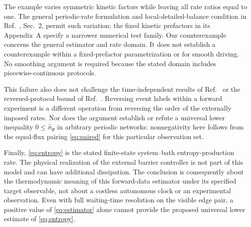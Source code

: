 \documentclass[11pt,a4paper]{article}
\newcommand{\sigw}{\widehat{\sigma}_{\Psi}}
\begin{document}
The example varies symmetric kinetic factors while leaving all rate ratios equal to one. The general periodic-rate formulation and local-detailed-balance condition in Ref.~\cite{Maier2024}, Sec.~2, permit such variation; the fixed kinetic prefactors in its Appendix~A specify a narrower numerical test family. Our counterexample concerns the general estimator and rate domain. It does not establish a counterexample within a fixed-prefactor parametrization or for smooth driving. No smoothing argument is required because the stated domain includes piecewise-continuous protocols.

This failure also does not challenge the time-independent results of Ref.~\cite{vanderMeer2022} or the reversed-protocol bound of Ref.~\cite{Maier2024}. Reversing event labels within a forward experiment is a different operation from reversing the order of the externally imposed rates. Nor does the argument establish or refute a universal lower inequality $0\le\sigw$ in arbitrary periodic networks: nonnegativity here follows from the equal-flux pairing \eqref{eq:paired} for this particular observation set.

Finally, \eqref{eq:entropy} is the stated finite-state system--bath entropy-production rate. The physical realization of the external barrier controller is not part of this model and can have additional dissipation. The conclusion is consequently about the thermodynamic meaning of this forward-data estimator under its specified target observable, not about a costless autonomous clock or an experimental observation. Even with full waiting-time resolution on the visible edge pair, a positive value of \eqref{eq:estimator} alone cannot provide the proposed universal lower estimate of \eqref{eq:entropy}.

\appendix
\end{document}
